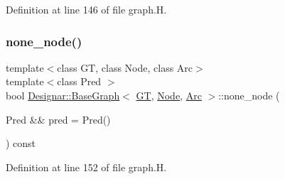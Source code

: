 Definition at line 146 of file graph.\+H.

\mbox{\label{class_designar_1_1_base_graph_a394cdb81d0b0402e348dc87d2456d2d7}} 
\subsubsection{\texorpdfstring{none\+\_\+node()}{none\_node()}\hspace{0.1cm}{\footnotesize\ttfamily [2/2]}}
{\footnotesize\ttfamily template$<$class GT, class Node, class Arc$>$ \\
template$<$class Pred $>$ \\
bool \hyperlink{class_designar_1_1_base_graph}{Designar\+::\+Base\+Graph}$<$ \hyperlink{demo-buildgraph_8_c_a3001c40d2c31ca87ed96cd7d1334a55e}{GT}, \hyperlink{namespace_designar_a5af326c65aa2bd26b26c410f2030d09e}{Node}, \hyperlink{namespace_designar_a3f55fb5513d62ff47cbc8f72b8e95d6f}{Arc} $>$\+::none\+\_\+node (\begin{DoxyParamCaption}\item[{Pred \&\&}]{pred = {\ttfamily Pred()} }\end{DoxyParamCaption}) const\hspace{0.3cm}{\ttfamily [inline]}}



Definition at line 152 of file graph.\+H.

\mbox{\label{class_designar_1_1_base_graph_aa0047160fb8424fe88dc7c1785f66827}} 
